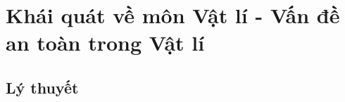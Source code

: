 \let\lesson\undefined
\newcommand{\lesson}{\phantomlesson{Bài 1 + 2: Khái quát về môn Vật lí - Vấn đề an toàn trong Vật lí}}
\chapter[Khái quát về môn Vật lí - Vấn đề an toàn trong Vật lí]{Khái quát về môn Vật lí - Vấn đề an toàn trong Vật lí}
\section{Lý thuyết}

